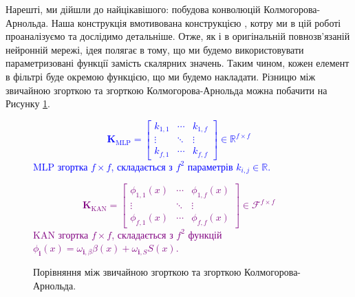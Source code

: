 Нарешті, ми дійшли до найцікавішого: побудова конволюцій Колмогорова-Арнольда.
Наша конструкція вмотивована конструкцією \cite{kan-cnn}, котру ми в цій роботі
проаналізуємо та дослідимо детальніше. Отже, як і в оригінальній повнозв'язаній 
нейронній мережі, ідея полягає в тому, що ми будемо використовувати 
параметризовані функції замість скалярних значень. Таким чином, 
кожен елемент в фільтрі буде окремою функцією, що ми будемо накладати.
Різницю між звичайною згорткою та згорткою Колмогорова-Арнольда можна
побачити на Рисунку \ref{fig:kan_conv}.
\begin{figure}
\noindent
    \begin{minipage}{0.48\linewidth}
    \textcolor{blue}{
    \begin{equation*}
    \boldsymbol{K}_{\text{MLP}} = \begin{bmatrix}
        k_{1,1} & \cdots & k_{1,f} \\
        \vdots & \ddots & \vdots \\
        k_{f,1} & \cdots & k_{f,f}
    \end{bmatrix} \in \mathbb{R}^{f \times f}
    \end{equation*}
    MLP згортка $f \times f$, складається з $f^2$ параметрів $k_{i,j} \in \mathbb{R}$.}
    \end{minipage}
    \hfill
    \begin{minipage}{0.48\linewidth}
    \textcolor{purple}{
    \begin{equation*}
    \boldsymbol{K}_{\text{KAN}} = \begin{bmatrix}
        \phi_{1,1}(x) & \cdots & \phi_{1,f}(x) \\
        \vdots & \ddots & \vdots \\
        \phi_{f,1}(x) & \cdots & \phi_{f,f}(x)
    \end{bmatrix} \in \mathcal{F}^{f \times f}
    \end{equation*}
    KAN згортка $f \times f$, складається з $f^2$ функцій
    $\phi_{\boldsymbol{i}}(x)=\omega_{\boldsymbol{i},\beta}\beta(x)+\omega_{\boldsymbol{i},S} S(x)$.}
    \end{minipage}
    \caption{Порівняння між звичайною згорткою та згорткою Колмогорова-Арнольда.}
    \label{fig:kan_conv}
\end{figure}

